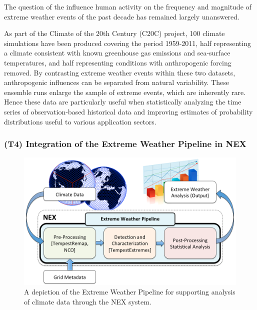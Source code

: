 \documentclass[11pt]{article}
\begin{document}
The question of the influence human activity on the frequency and magnitude of extreme weather events of the past decade has remained largely unanswered.

As part of the Climate of the 20th Century (C20C) project, 100 climate simulations have been produced covering the period 1959-2011, half representing a climate consistent with known greenhouse gas emissions and sea-surface temperatures, and half representing conditions with anthropogenic forcing removed.  By contrasting extreme weather events within these two datasets, anthropogenic influences can be separated from natural variability. These ensemble runs enlarge the sample of extreme events, which are inherently rare. Hence these data are particularly useful when statistically analyzing the time series of observation-based historical data and improving estimates of probability distributions useful to various application sectors.


\subsubsection{(T4) Integration of the Extreme Weather Pipeline in NEX}

\begin{figure}
\begin{center}
\includegraphics[width=5in]{TempestPipeline.png}
\end{center}
\caption{A depiction of the Extreme Weather Pipeline for supporting analysis of climate data through the NEX system.} \label{fig:TempestPipeline}
\end{figure}
\end{document}
